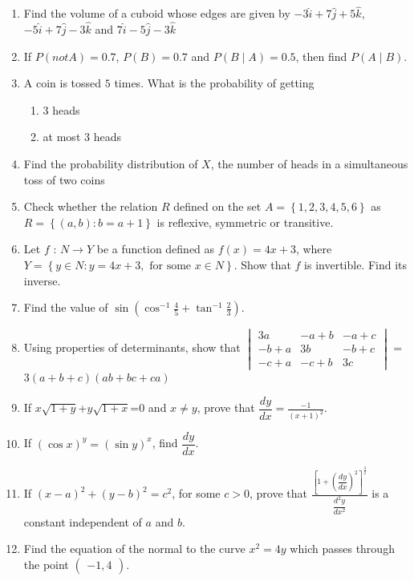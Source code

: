 \documentclass[12pt,-letter paper]{article}
\providecommand{\sbrak}[1]{\ensuremath{{}\left[#1\right]}}
\providecommand{\brak}[1]{\ensuremath{\left(#1\right)}}
\providecommand{\cbrak}[1]{\ensuremath{\left\{#1\right\}}}
\theoremstyle{remark}
\newcommand{\myvec}[1]{\ensuremath{\begin{pmatrix}#1\end{pmatrix}}}
\newcommand{\mydet}[1]{\ensuremath{\begin{vmatrix}#1\end{vmatrix}}}
\begin{document}
\begin{enumerate}
\item Find the volume of a cuboid whose edges are given by $-3\hat{i}+7\hat{j}+5\hat{k}$,$-5\hat{i}+7\hat{j}-3\hat{k}$ and $7\hat{i}-5\hat{j}-3\hat{k}$
\item If $P(not A) =0.7$, $P(B)=0.7$ and $P(B\mid A)=0.5$, then find $P(A\mid B)$.

\item A coin is tossed $5$ times. What is the probability of getting 
\begin{enumerate}[label=(\roman*)]
    \item $3$ heads
    \item at most $3$ heads
\end{enumerate}

\item Find the probability distribution of $X$, the number of heads in a simultaneous toss of two coins

\item Check whether the relation $R$ defined on the set $A=\cbrak{1,2,3,4,5,6}$ as $R =\cbrak {(a, b) : b = a + 1}$ is reflexive, symmetric or transitive.

\item Let $f$ : $N\rightarrow Y $ be a function defined as $f\brak{x}= 4x + 3$, where $Y=\cbrak{y\in N:y=4x+3, \text{ for some } x\in N}$. Show that $f$ is invertible. Find its inverse.

\item Find the value of $\sin\brak{\cos^{-1}{\frac{4}{5}}+{\tan^{-1}{\frac{2}{3}}}}$.
\item Using properties of determinants, show that \mydet{3a & -a+b & -a+c \\ -b+a & 3b & -b+c \\ -c+a & -c+b & 3c} = 3\brak{a+b+c}\brak{ab+bc+ca}

\item If $x\sqrt{1+y}$+$y\sqrt{1+x}$=0 and $x\neq y$, prove that $\dfrac{dy}{dx} = \frac{-1}{\brak{x+1}^2}$.

\item If $\brak{\cos x}^y = \brak{\sin y }^x$, find $\dfrac{dy}{dx}$.

\item If $\brak{x-a}^2+\brak{y-b}^2={c}^2$, for some $c>0$, prove that
$\frac{\sbrak{1+\brak{\dfrac{dy}{dx}}^2}^\frac{3}{2}}{\dfrac{d^2y}{dx^2}}$ is a constant independent of $a$ and $b$.

\item Find the equation of the normal to the curve ${x}^2 = 4y$ which passes through the point $\myvec{-1,4}$.


\end{enumerate}
\end{document}
